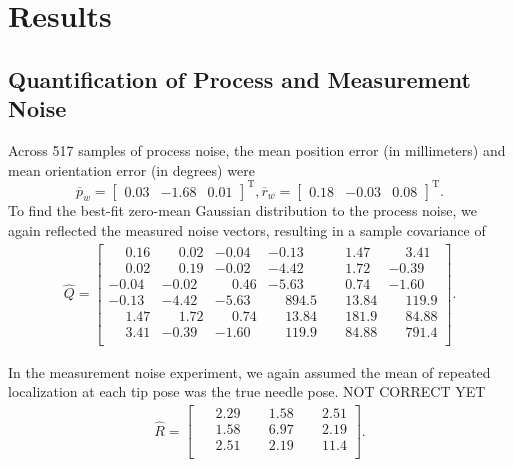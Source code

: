 \section{Results}
\label{sec:HumanInTheLoopResults}

\subsection{Quantification of Process and Measurement Noise}
Across 517 samples of process noise, the mean position error (in millimeters) and mean orientation error (in degrees) were \[{\overline{p}_{w}} = \begin{bmatrix} 0.03 &-1.68 &0.01 \end{bmatrix}^{\text{T}}, {\overline{r}_{w}} = \begin{bmatrix} 0.18 &-0.03 &0.08 \end{bmatrix}^{\text{T}}.\] To find the best-fit zero-mean Gaussian distribution to the process noise, we again reflected the measured noise vectors, resulting in a sample covariance of
\begin{align*}
{\hat{Q}} = \begin{bmatrix} 
\phantom{-}0.16 & \phantom{-}0.02 	&-0.04 & -0.13 & \phantom{-}1.47 & \phantom{-}3.41\\
\phantom{-}0.02 & \phantom{-}0.19 & -0.02 & -4.42 & \phantom{-}1.72 & -0.39 \\ 
-0.04 & -0.02 & \phantom{-}0.46 & -5.63 & \phantom{-}0.74 & -1.60 \\
-0.13 & -4.42 & -5.63 & \phantom{-}894.5 & \phantom{-}13.84 & \phantom{-}119.9 \\
\phantom{-}1.47 & \phantom{-}1.72 & \phantom{-}0.74 & \phantom{-}13.84 & \phantom{-}181.9 & \phantom{-}84.88 \\
\phantom{-}3.41 & -0.39 & -1.60 & \phantom{-}119.9 & \phantom{-}84.88 & \phantom{-}791.4\\ 
\end{bmatrix}.
\end{align*}

In the measurement noise experiment, we again assumed the mean of repeated localization at each tip pose was the true needle pose. NOT CORRECT YET
\begin{align*}
{\hat{R}} = \begin{bmatrix} 
\phantom{-}2.29 & \phantom{-}1.58 & \phantom{-}2.51 \\ 
\phantom{-}1.58 & \phantom{-}6.97 & \phantom{-}2.19 \\ 
\phantom{-}2.51 & \phantom{-}2.19 & \phantom{-}11.4 \\ 
\end{bmatrix}.
\end{align*}
